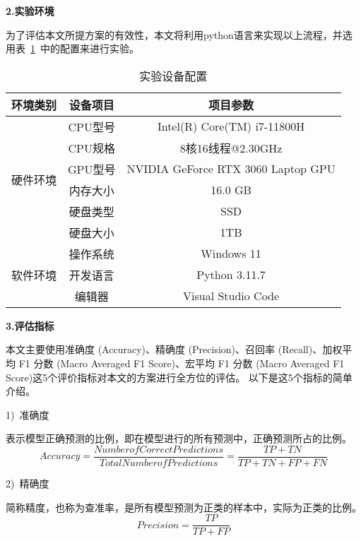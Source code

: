 \textbf{2.实验环境}\par
为了评估本文所提方案的有效性，本文将利用python语言来实现以上流程，并选用表~\ref{tab:env_setting}~中的配置来进行实验。
\begin{table}[htbp]
	\caption{实验设备配置}
	\label{tab:env_setting}
	\centering
	\begin{tabular}{ccc}
		\toprule
		\textbf{环境类别}         & \textbf{设备项目} & \textbf{项目参数}                  \\
		\midrule
		\multirow{6}{*}{硬件环境} & CPU型号           & Intel(R) Core(TM) i7-11800H        \\
		                          & CPU规格           & 8核16线程@2.30GHz                  \\
		                          & GPU型号           & NVIDIA GeForce RTX 3060 Laptop GPU \\
		                          & 内存大小          & 16.0 GB                            \\
		                          & 硬盘类型          & SSD                                \\
		                          & 硬盘大小          & 1TB                                \\
		\hline
		\multirow{3}{*}{软件环境} & 操作系统          & Windows 11                         \\
		                          & 开发语言          & Python 3.11.7                      \\
		                          & 编辑器            & Visual Studio Code                 \\
		\bottomrule
	\end{tabular}
\end{table}

\textbf{3.评估指标}\par
本文主要使用准确度 (Accuracy)、精确度 (Precision)、召回率 (Recall)、加权平均 F1 分数 (Macro Averaged F1 Score)、宏平均 F1 分数 (Macro Averaged F1 Score)这5个评价指标对本文的方案进行全方位的评估。
以下是这5个指标的简单介绍。\par
1)~准确度\par
表示模型正确预测的比例，即在模型进行的所有预测中，正确预测所占的比例。
\begin{equation}
	\label{eq:val_score1}
	Accuracy = \frac{Number of Correct Predictions}{Total Number of Predictions} = \frac{TP + TN}{TP + TN + FP + FN}
\end{equation}

2)~精确度\par
简称精度，也称为查准率，是所有模型预测为正类的样本中，实际为正类的比例。
\begin{equation}
	\label{eq:val_score2}
	Precision = \frac{TP}{TP + FP}
\end{equation}

